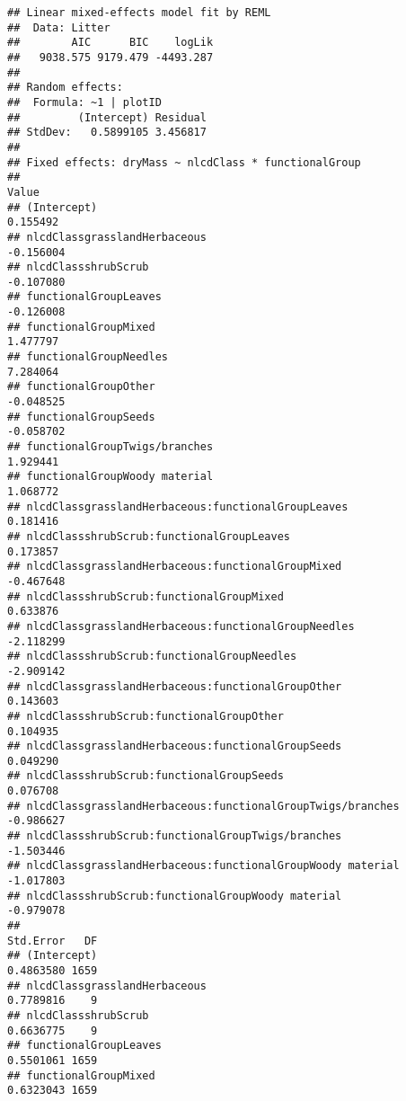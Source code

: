 \documentclass[]{article}
\begin{document}
\begin{verbatim}
## Linear mixed-effects model fit by REML
##  Data: Litter 
##        AIC      BIC    logLik
##   9038.575 9179.479 -4493.287
## 
## Random effects:
##  Formula: ~1 | plotID
##         (Intercept) Residual
## StdDev:   0.5899105 3.456817
## 
## Fixed effects: dryMass ~ nlcdClass * functionalGroup 
##                                                                Value
## (Intercept)                                                 0.155492
## nlcdClassgrasslandHerbaceous                               -0.156004
## nlcdClassshrubScrub                                        -0.107080
## functionalGroupLeaves                                      -0.126008
## functionalGroupMixed                                        1.477797
## functionalGroupNeedles                                      7.284064
## functionalGroupOther                                       -0.048525
## functionalGroupSeeds                                       -0.058702
## functionalGroupTwigs/branches                               1.929441
## functionalGroupWoody material                               1.068772
## nlcdClassgrasslandHerbaceous:functionalGroupLeaves          0.181416
## nlcdClassshrubScrub:functionalGroupLeaves                   0.173857
## nlcdClassgrasslandHerbaceous:functionalGroupMixed          -0.467648
## nlcdClassshrubScrub:functionalGroupMixed                    0.633876
## nlcdClassgrasslandHerbaceous:functionalGroupNeedles        -2.118299
## nlcdClassshrubScrub:functionalGroupNeedles                 -2.909142
## nlcdClassgrasslandHerbaceous:functionalGroupOther           0.143603
## nlcdClassshrubScrub:functionalGroupOther                    0.104935
## nlcdClassgrasslandHerbaceous:functionalGroupSeeds           0.049290
## nlcdClassshrubScrub:functionalGroupSeeds                    0.076708
## nlcdClassgrasslandHerbaceous:functionalGroupTwigs/branches -0.986627
## nlcdClassshrubScrub:functionalGroupTwigs/branches          -1.503446
## nlcdClassgrasslandHerbaceous:functionalGroupWoody material -1.017803
## nlcdClassshrubScrub:functionalGroupWoody material          -0.979078
##                                                            Std.Error   DF
## (Intercept)                                                0.4863580 1659
## nlcdClassgrasslandHerbaceous                               0.7789816    9
## nlcdClassshrubScrub                                        0.6636775    9
## functionalGroupLeaves                                      0.5501061 1659
## functionalGroupMixed                                       0.6323043 1659

\end{verbatim}
\end{document}
